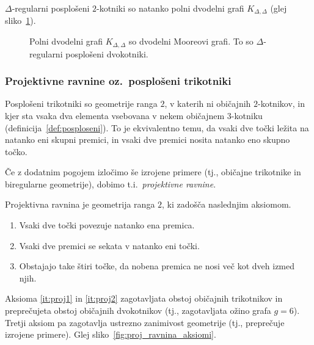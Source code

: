 \documentclass[fin1, tisk]{fmfdelo}
\begin{document}
\begin{opomba}
    $\Delta$-regularni posplošeni $2$-kotniki so natanko polni dvodelni 
    grafi $K_{\Delta, \Delta}$ (glej sliko~\ref{fig:dvokotnik_geom}).
\end{opomba}

\begin{figure}[ht]
    \centering
    \def\svgwidth{\columnwidth}
    \caption{Polni dvodelni grafi $K_{\Delta, \Delta}$ so dvodelni Mooreovi grafi. To so
        $\Delta$-regularni posplošeni dvokotniki.}
    \label{fig:dvokotnik_geom}
\end{figure}


\subsubsection{Projektivne ravnine oz.~posplošeni trikotniki}

Posplošeni trikotniki so geometrije ranga $2$, v katerih ni običajnih $2$-kotnikov,
in kjer sta vsaka dva elementa vsebovana v nekem običajnem $3$-kotniku (definicija~\ref{def:posploseni}). To je
ekvivalentno temu, da vsaki dve točki ležita na natanko eni skupni premici,
in vsaki dve premici nosita natanko eno skupno točko. %

Če z dodatnim pogojem izločimo še izrojene primere (tj., običajne trikotnike in biregularne geometrije), 
dobimo t.i.~\emph{projektivne ravnine}.

\begin{definicija}\label{def:projektivna_ravnina}
    Projektivna ravnina je geometrija ranga $2$, ki zadošča naslednjim aksiomom.
    \begin{enumerate}[label=(\roman*)]
        \item Vsaki dve točki povezuje natanko ena premica.\label{it:proj1}
        \item Vsaki dve premici se sekata v natanko eni točki.\label{it:proj2}
        \item Obstajajo take štiri točke, da nobena premica ne nosi več kot dveh izmed njih.\label{it:proj3}
    \end{enumerate}
\end{definicija}

\begin{opomba}
    Aksioma \ref{it:proj1} in \ref{it:proj2} zagotavljata obstoj običajnih trikotnikov
    in preprečujeta obstoj običajnih dvokotnikov (tj., zagotavljata ožino grafa $g=6$). Tretji aksiom pa zagotavlja ustrezno
    zanimivost geometrije (tj., preprečuje izrojene primere). Glej sliko~\ref{fig:proj_ravnina_aksiomi}.
\end{opomba}
\end{document}
